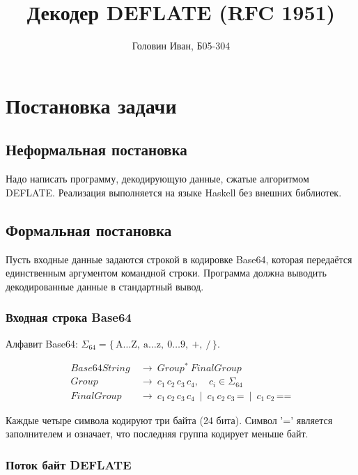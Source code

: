 \documentclass[12pt,a4paper]{article}
\begin{document}
\title{Декодер DEFLATE (RFC 1951)}
\author{Головин Иван, Б05-304}
\date{}

\maketitle

\section{Постановка задачи}

\subsection{Неформальная постановка}

Надо написать программу, декодирующую данные, сжатые алгоритмом DEFLATE. Реализация выполняется на языке Haskell
без внешних библиотек.

\subsection{Формальная постановка}

Пусть входные данные задаются строкой в кодировке Base64, которая передаётся
единственным аргументом командной строки. Программа должна выводить декодированные
данные в стандартный вывод.

\subsubsection{Входная строка Base64}

Алфавит Base64: $\Sigma_{64} = \{\,\text{A}\dots\text{Z},\ \text{a}\dots\text{z},\ \text{0}\dots\text{9},\ \text{+},\ \text{/}\,\}$.

\[
\begin{aligned}
Base64String &\ \to\  Group^*\  FinalGroup \\
Group        &\ \to\  c_1\,c_2\,c_3\,c_4,\quad c_i \in \Sigma_{64} \\
FinalGroup   &\ \to\  c_1\,c_2\,c_3\,c_4 \ \mid\  c_1\,c_2\,c_3\,\text{=} \ \mid\  c_1\,c_2\,\text{==}
\end{aligned}
\]

Каждые четыре символа кодируют три байта (24 бита). Символ '=' является
заполнителем и означает, что последняя группа кодирует меньше байт.

\subsubsection{Поток байт DEFLATE}
\end{document}
